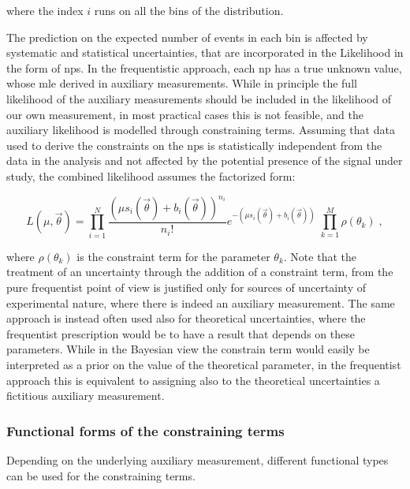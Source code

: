 \noindent where the index $i$ runs on all the bins of the distribution.

The prediction on the expected number of events in each bin is affected by systematic and statistical uncertainties, that are incorporated in the Likelihood in the form of \glspl{np}. 
In the frequentistic approach, each \gls{np} has a true unknown value, whose \gls{mle} derived in auxiliary measurements. 
While in principle the full likelihood of the auxiliary measurements should be included in the likelihood of our own measurement, 
in most practical cases this is not feasible, and the auxiliary likelihood is modelled through constraining terms. 
Assuming that data used to derive the constraints on the \glspl{np} is statistically independent from the data in the analysis and not affected by the potential presence of the signal under study, the combined likelihood assumes the factorized form:

\begin{equation}
\label{eq:stat:lik_sys}
L(\mu, \vec{\theta}) =
\prod_{i=1}^N \frac{ (\mu s_{i}(\vec{\theta}) +
b_{i}(\vec{\theta}) )^{n_{i}} }{ n_{i}! }
e^{- (\mu s_{i}(\vec{\theta}) + b_{i}(\vec{\theta})) }   \;
\prod_{k=1}^M \rho( \theta_k) \; ,
\end{equation}

\noindent where $\rho( \theta_k)$ is the constraint term for the parameter $\theta_k$. Note that the treatment of an uncertainty through the addition of a constraint term, from the pure frequentist point of view is justified only for sources of uncertainty of experimental nature, where there is indeed an auxiliary measurement. The same approach is instead often used also for theoretical uncertainties, where the frequentist prescription would be to have a result that depends on these parameters. While in the Bayesian view the constrain term would easily be interpreted as a prior on the value of the theoretical parameter, in the frequentist approach this is equivalent to assigning also to the theoretical uncertainties a fictitious auxiliary measurement. 


\subsubsection*{Functional forms of the constraining terms}

Depending on the underlying auxiliary measurement, different functional types can be used for the constraining terms.


